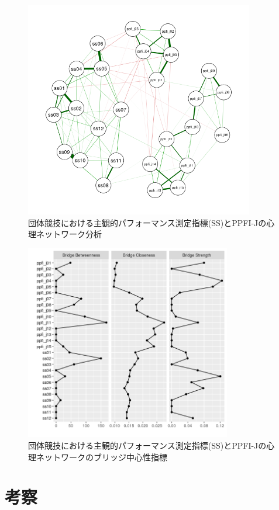 \documentclass[12pt,a4paper,xelatex,ja=standard]{bxjsarticle}
\begin{document}
\begin{figure}[H]
\centering
\includegraphics[clip,width = 10cm]{figure/team network.png}
\caption{団体競技における主観的パフォーマンス測定指標(SS)とPPFI-Jの心理ネットワーク分析}
\end{figure}

\begin{figure}[H]
\centering
\includegraphics[clip,width = 9cm]{figure/team bridge.png}
\caption{団体競技における主観的パフォーマンス測定指標(SS)とPPFI-Jの心理ネットワークのブリッジ中心性指標}
\end{figure}

\clearpage

\hypertarget{ux8003ux5bdf}{%
\section{考察}\label{ux8003ux5bdf}}
\end{document}
